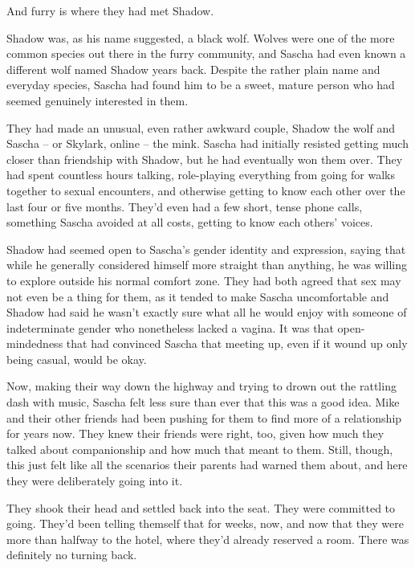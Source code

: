 And furry is where they had met Shadow.

Shadow was, as his name suggested, a black wolf. Wolves were one of the more common species out there in the furry community, and Sascha had even known a different wolf named Shadow years back. Despite the rather plain name and everyday species, Sascha had found him to be a sweet, mature person who had seemed genuinely interested in them.

They had made an unusual, even rather awkward couple, Shadow the wolf and Sascha -- or Skylark, online -- the mink. Sascha had initially resisted getting much closer than friendship with Shadow, but he had eventually won them over. They had spent countless hours talking, role-playing everything from going for walks together to sexual encounters, and otherwise getting to know each other over the last four or five months. They'd even had a few short, tense phone calls, something Sascha avoided at all costs, getting to know each others' voices.

Shadow had seemed open to Sascha's gender identity and expression, saying that while he generally considered himself more straight than anything, he was willing to explore outside his normal comfort zone. They had both agreed that sex may not even be a thing for them, as it tended to make Sascha uncomfortable and Shadow had said he wasn't exactly sure what all he would enjoy with someone of indeterminate gender who nonetheless lacked a vagina. It was that open-mindedness that had convinced Sascha that meeting up, even if it wound up only being casual, would be okay.

Now, making their way down the highway and trying to drown out the rattling dash with music, Sascha felt less sure than ever that this was a good idea. Mike and their other friends had been pushing for them to find more of a relationship for years now. They knew their friends were right, too, given how much they talked about companionship and how much that meant to them. Still, though, this just felt like all the scenarios their parents had warned them about, and here they were deliberately going into it.

They shook their head and settled back into the seat. They were committed to going. They'd been telling themself that for weeks, now, and now that they were more than halfway to the hotel, where they'd already reserved a room.  There was definitely no turning back.
